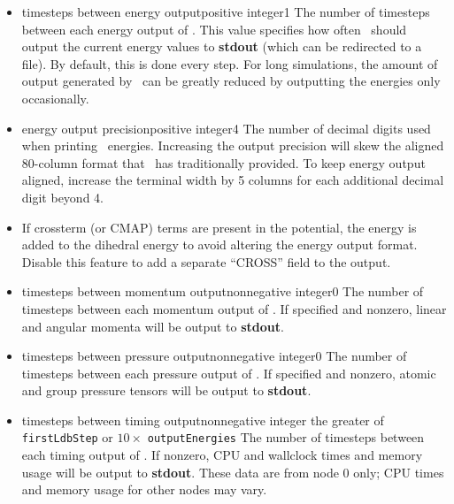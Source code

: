 \begin{itemize}
\item
{}
{timesteps between energy output}{positive integer}{1}
{
The number of timesteps between each energy output of \NAMD.  
This value
specifies how often \NAMD\ should output the current energy 
values to {\bf stdout} (which can be redirected to a file).  
By default, this is done every step.  
For long simulations, 
the amount of output generated by \NAMD\ can be greatly reduced 
by outputting the energies only occasionally.  
}

\item
{}
{energy output precision}{positive integer}{4}
{
The number of decimal digits used when printing \NAMD\ energies.
Increasing the output precision will skew the aligned 80-column format 
that \NAMD\ has traditionally provided.  To keep energy output aligned, 
increase the terminal width by 5 columns for each additional decimal digit 
beyond 4. 
}

\item
{}
{
If crossterm (or CMAP) terms are present in the potential,
the energy is added to the dihedral energy to avoid altering
the energy output format.
Disable this feature to add a separate ``CROSS'' field to the output.
}

\item
{}
{timesteps between momentum output}{nonnegative integer}{0}
{
The number of timesteps between each momentum output of \NAMD.
If specified and nonzero, linear and angular momenta will be
output to {\bf stdout}.
}

\item
{}
{timesteps between pressure output}{nonnegative integer}{0}
{
The number of timesteps between each pressure output of \NAMD.
If specified and nonzero, atomic and group pressure tensors
will be output to {\bf stdout}.
}

\item
{}
{timesteps between timing output}{nonnegative integer}
{the greater of {\tt firstLdbStep} or $10 \times$ {\tt outputEnergies}}
{
The number of timesteps between each timing output of \NAMD.
If nonzero, CPU and wallclock times and memory usage will be
output to {\bf stdout}.
These data are from node 0 only; CPU times and memory usage for other nodes
may vary.
}

\end{itemize}


